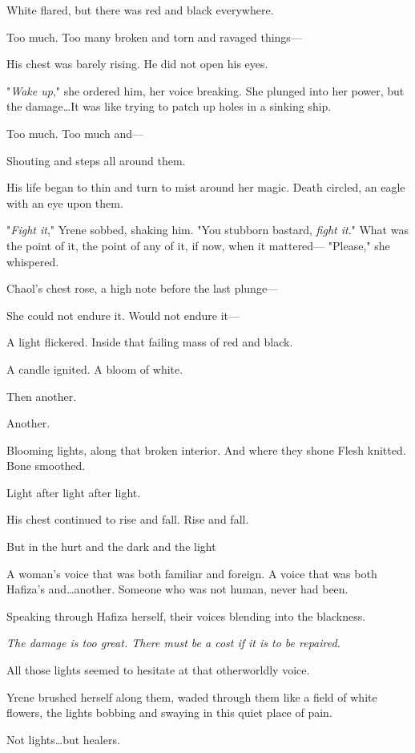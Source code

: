 White flared, but there was red and black everywhere.

Too much.
Too many broken and torn and ravaged things---

His chest was barely rising.
He did not open his eyes.

"\emph{Wake up}," she ordered him, her voice breaking.
She plunged into her power, but the damage\ldots It was like trying to patch up holes in a sinking ship.

Too much.
Too much and---

Shouting and steps all around them.

His life began to thin and turn to mist around her magic.
Death circled, an eagle with an eye upon them.

"\emph{Fight it}," Yrene sobbed, shaking him.
"You stubborn bastard,
\emph{fight it}."
What was the point of it, the point of any of it, if now, when it mattered--- "Please," she whispered.

Chaol's chest rose, a high note before the last plunge---

She could not endure it.
Would not endure it---

A light flickered.
Inside that failing mass of red and black.

A candle ignited.
A bloom of white.

Then another.

Another.

Blooming lights, along that broken interior.
And where they shone  Flesh knitted.
Bone smoothed.

Light after light after light.

His chest continued to rise and fall.
Rise and fall.

But in the hurt and the dark and the light 

A woman's voice that was both familiar and foreign.
A voice that was both Hafiza's and\ldots another.
Someone who was not human, never had been.

Speaking through Hafiza herself, their voices blending into the blackness.

\emph{The damage is too great.
There must be a cost if it is to be repaired.}

All those lights seemed to hesitate at that otherworldly voice.

Yrene brushed herself along them, waded through them like a field of white flowers, the lights bobbing and swaying in this quiet place of pain.

Not lights\ldots but healers.

